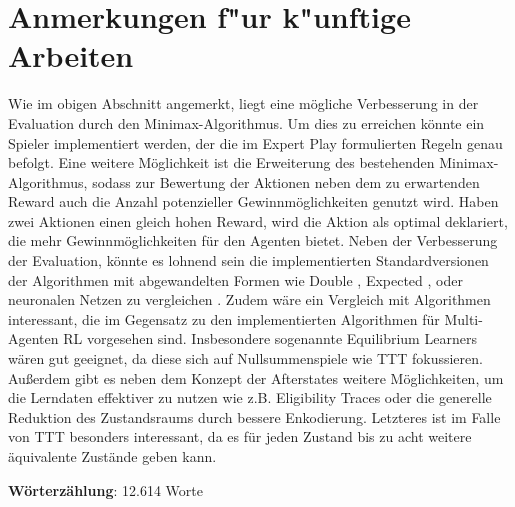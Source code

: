 \section{Anmerkungen f"ur k"unftige Arbeiten}
Wie im obigen Abschnitt angemerkt, liegt eine mögliche Verbesserung in der Evaluation durch den Minimax-Algorithmus.
Um dies zu erreichen könnte ein Spieler implementiert werden, der die im Expert Play formulierten Regeln genau befolgt. 
Eine weitere Möglichkeit ist die Erweiterung des bestehenden Minimax-Algorithmus, sodass zur Bewertung der Aktionen neben dem zu erwartenden Reward auch die Anzahl potenzieller Gewinnmöglichkeiten genutzt wird.
Haben zwei Aktionen einen gleich hohen Reward, wird die Aktion als optimal deklariert, die mehr Gewinnmöglichkeiten für den Agenten bietet.
Neben der Verbesserung der Evaluation, könnte es lohnend sein die implementierten Standardversionen der Algorithmen mit abgewandelten Formen wie Double \qlearning, Expected \sarsa \cite[S. 133ff.]{suttonReinforcementLearningIntroduction2018}, \cite{littmanMarkovGamesFramework1994} oder neuronalen Netzen \cite{konenParameterSelection2008} zu vergleichen  . 
Zudem wäre ein Vergleich mit Algorithmen interessant, die im Gegensatz zu den implementierten Algorithmen für Multi-Agenten \ac{RL} vorgesehen sind. 
Insbesondere sogenannte Equilibrium Learners wären gut geeignet, da diese sich auf Nullsummenspiele wie \ac{TTT} fokussieren. \cite[S. 39]{netoSingleAgentMultiAgentReinforcement} 
Außerdem gibt es neben dem Konzept der Afterstates weitere Möglichkeiten, um die Lerndaten effektiver zu nutzen wie z.B. Eligibility Traces \cite{singhReinforcementLearningReplacing1996} oder die generelle Reduktion des Zustandsraums durch bessere Enkodierung. 
Letzteres ist im Falle von \ac {TTT} besonders interessant, da es für jeden Zustand bis zu acht weitere äquivalente Zustände geben kann.

\vspace{1cm}
\textbf{Wörterzählung}: 12.614 Worte

